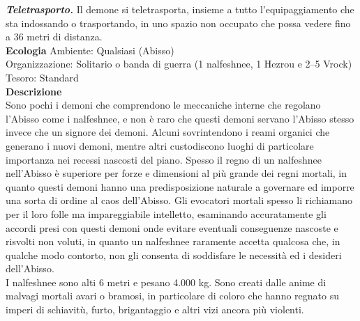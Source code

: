 \begin{multicols}{2}
\emph{\textbf{Teletrasporto.}} Il demone si teletrasporta, insieme a tutto l'equipaggiamento che sta indossando o trasportando, in uno spazio non occupato che possa vedere fino a 36 metri di distanza.\\
\textbf{Ecologia}
Ambiente: Qualsiasi (Abisso)\\
Organizzazione: Solitario o banda di guerra (1 nalfeshnee, 1 Hezrou e 2–5 Vrock)\\
Tesoro: Standard\\
\textbf{Descrizione}\\
Sono pochi i demoni che comprendono le meccaniche interne che regolano l'Abisso come i nalfeshnee, e non è raro che questi demoni servano l'Abisso stesso invece che un signore dei demoni. Alcuni sovrintendono i reami organici che generano i nuovi demoni, mentre altri custodiscono luoghi di particolare importanza nei recessi nascosti del piano. Spesso il regno di un nalfeshnee nell'Abisso è superiore per forze e dimensioni al più grande dei regni mortali, in quanto questi demoni hanno una predisposizione naturale a governare ed imporre una sorta di ordine al caos dell'Abisso. Gli evocatori mortali spesso li richiamano per il loro folle ma impareggiabile intelletto, esaminando accuratamente gli accordi presi con questi demoni onde evitare eventuali conseguenze nascoste e risvolti non voluti, in quanto un nalfeshnee raramente accetta qualcosa che, in qualche modo contorto, non gli consenta di soddisfare le necessità ed i desideri dell'Abisso.\\
I nalfeshnee sono alti 6 metri e pesano 4.000 kg. Sono creati dalle anime di malvagi mortali avari o bramosi, in particolare di coloro che hanno regnato su imperi di schiavitù, furto, brigantaggio e altri vizi ancora più violenti.\\


\end{multicols}
